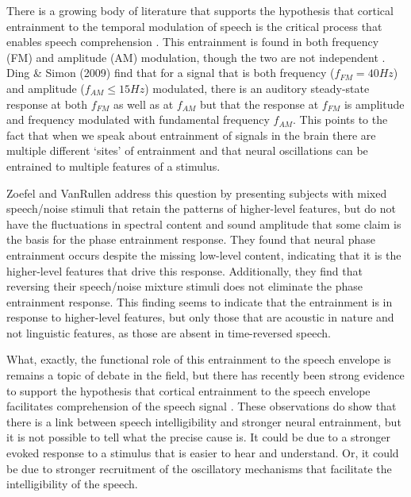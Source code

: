 \documentclass[titlepage]{article}
\begin{document}
    There is a growing body of literature that supports
    the hypothesis that cortical entrainment to the temporal modulation of
    speech is the critical process that enables speech comprehension
    \cite{Meyer2018,Morillon2015,ZionGolumbic2013,Doelling2014}. This
    entrainment is found in both frequency (FM) and amplitude (AM) modulation,
    though the two are not independent \cite{Ding2009}. Ding \& Simon (2009)
    \cite{Ding2009} find that for a signal that is both frequency
    ($f_{FM}=40Hz$) and amplitude ($f_{AM}\leq 15Hz$) modulated, there is an
    auditory steady-state response at both $f_{FM}$ as well as at $f_{AM}$ but
    that the response at $f_{FM}$ is amplitude and frequency modulated with
    fundamental frequency $f_{AM}$. This points to the fact that when we speak
    about entrainment of signals in the brain there are multiple different
    `sites' of entrainment and that neural oscillations can be entrained to
    multiple features of a stimulus.

    Zoefel and VanRullen \cite{Zoefel2016} address this question by presenting
    subjects with mixed speech/noise stimuli that retain the patterns of
    higher-level features, but do not have the fluctuations in spectral content
    and sound amplitude that some claim is the basis for the phase entrainment
    response. They found that neural phase entrainment occurs despite the
    missing low-level content, indicating that it is the higher-level features
    that drive this response. Additionally, they find that reversing their
    speech/noise mixture stimuli does not eliminate the phase entrainment
    response. This finding seems to indicate that the entrainment is in
    response to higher-level features, but only those that are acoustic in
    nature and not linguistic features, as those are absent in time-reversed
    speech.

    What, exactly, the functional role of this entrainment to the speech
    envelope is remains a topic of debate in the field, but there has recently
    been strong evidence to support the hypothesis that cortical entrainment to
    the speech envelope facilitates comprehension of the speech signal
    \cite{Ding2014a,Ding2012,OSullivan2015}. These observations do show that 
    there is a link between speech intelligibility and stronger neural 
    entrainment, but it is not possible to tell what the precise cause is. It 
    could be due to a stronger evoked response to a stimulus that is easier to 
    hear and understand. Or, it could be due to stronger recruitment of the 
    oscillatory mechanisms that facilitate the intelligibility of the speech.
\end{document}
